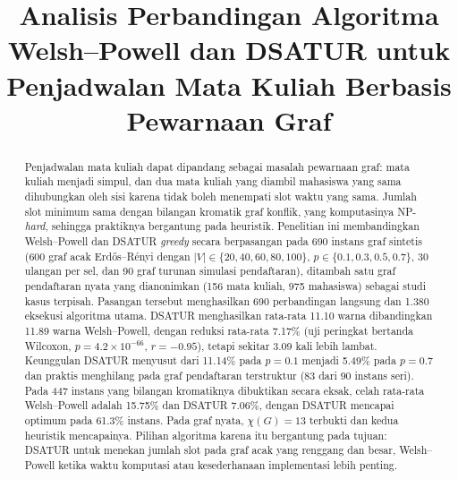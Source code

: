\documentclass[conference,a4paper]{IEEEtran}
\begin{document}
\title{Analisis Perbandingan Algoritma Welsh--Powell dan DSATUR untuk
Penjadwalan Mata Kuliah Berbasis Pewarnaan Graf}

\author{
}

\maketitle

\begin{abstract}
Penjadwalan mata kuliah dapat dipandang sebagai masalah pewarnaan graf: mata
kuliah menjadi simpul, dan dua mata kuliah yang diambil mahasiswa yang sama
dihubungkan oleh sisi karena tidak boleh menempati slot waktu yang sama.
Jumlah slot minimum sama dengan bilangan kromatik graf konflik, yang
komputasinya NP-\emph{hard}, sehingga praktiknya bergantung pada heuristik.
Penelitian ini membandingkan Welsh--Powell dan DSATUR \emph{greedy} secara
berpasangan pada 690 instans graf sintetis (600 graf acak Erd\H{o}s--R\'enyi
dengan $|V| \in \{20,40,60,80,100\}$, $p \in \{0.1,0.3,0.5,0.7\}$, 30 ulangan
per sel, dan 90 graf turunan simulasi pendaftaran), ditambah satu graf
pendaftaran nyata yang dianonimkan (156 mata kuliah, 975 mahasiswa) sebagai
studi kasus terpisah. Pasangan tersebut menghasilkan 690 perbandingan langsung
dan 1.380 eksekusi algoritma utama.
DSATUR menghasilkan rata-rata 11.10 warna dibandingkan 11.89 warna
Welsh--Powell, dengan reduksi rata-rata 7.17\% (uji peringkat bertanda Wilcoxon,
$p = 4.2\times10^{-66}$, $r = -0.95$), tetapi sekitar 3.09 kali lebih lambat.
Keunggulan DSATUR menyusut dari 11.14\% pada $p=0.1$ menjadi 5.49\% pada
$p=0.7$ dan praktis menghilang pada graf pendaftaran terstruktur (83 dari 90
instans seri). Pada 447 instans yang bilangan kromatiknya dibuktikan secara
eksak, celah rata-rata Welsh--Powell adalah 15.75\% dan DSATUR 7.06\%, dengan
DSATUR mencapai optimum pada 61.3\% instans. Pada graf nyata, $\chi(G)=13$
terbukti dan kedua heuristik mencapainya. Pilihan algoritma karena itu
bergantung pada tujuan: DSATUR untuk menekan jumlah slot pada graf acak yang
renggang dan besar, Welsh--Powell ketika waktu komputasi atau kesederhanaan
implementasi lebih penting.
\end{abstract}
\end{document}
